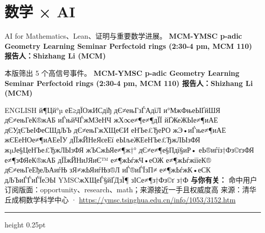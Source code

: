 \documentclass[10.5pt]{ctexart}
\begin{document}
\section*{数学 × AI}
{\color{ormuted} AI for Mathematics、Lean、证明与重要数学进展。}
\vspace{2mm}
{\LARGE\bfseries MCM-YMSC p-adic Geometry Learning Seminar Perfectoid rings (2:30-4 pm, MCM 110) 报告人：Shizhang Li (MCM)}\par
\vspace{1mm}
{\color{ormuted} 本版筛出 5 个高信号事件。}
\vspace{3mm}
{\Large\bfseries MCM-YMSC p-adic Geometry Learning Seminar Perfectoid rings (2:30-4 pm, MCM 110) 报告人：Shizhang Li (MCM)}\par
ENGLISH й¶Цй°µ еЕ≥дЇОжИСдїђ дЄ≠ењГзЃАдїЛ и°МжФњеЫҐйШЯ дЄ≠ењГеК®жАБ иЃњйЧЃжМЗеНЧ жХ∞е≠¶е≠¶дЇЇ йҐЖеЖЫе≠¶иАЕ дЄУдЄЪеІФеСШдЉЪ дЄ≠ењГжХЩеЄИ еНЪе£ЂеРО жЭ•иЃње≠¶иАЕ жЄЕеНОе≠¶иАЕеЇУ дЇЇжЙНеЯєеЕї еЫљеЖЕеНЪе£ЂжЛЫзФЯ жµЈе§ЦеНЪе£ЂжЛЫзФЯ жЪСжЬЯе≠¶ж†° дЄ≠е≠¶е§Пдї§иР• еЬ®иѓїз†Фз©ґзФЯ е≠¶зФЯеК®жАБ дЇЇжЙНиЈЯиЄ™ е≠¶жЬѓжЧ•еОЖ е≠¶жЬѓжіїеК® дЄ≠ењГеЕђеЉАиѓЊ зЯ≠жЬЯиѓЊз®Л иЃ®иЃЇзП≠ е≠¶жЬѓжК•еСК дЉЪиЃЃиЃЇеЭЫ YMSCжХЩеЃ§йҐДзЇ¶ зІСе≠¶з†Фз©ґ з†Ф
\textbf{与你有关：} 命中用户订阅版面：opportunity、research、math；来源接近一手且权威度高
{\footnotesize\color{ormuted} 来源：清华丘成桐数学科学中心 · \url{https://ymsc.tsinghua.edu.cn/info/1053/3152.htm}}
\vspace{4mm}
\hrule height 0.25pt
\vspace{3mm}
\end{document}
